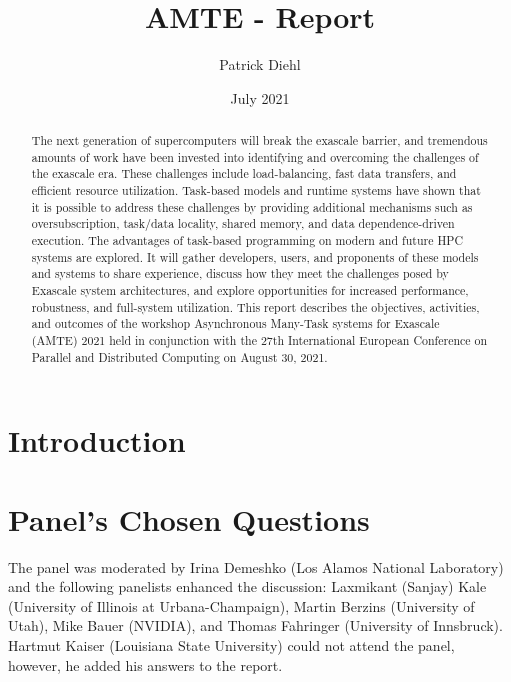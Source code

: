\documentclass{article}
\title{AMTE - Report}
\author{Patrick Diehl}
\date{July 2021}
\begin{document}
\maketitle

\newcommand{\answerbox}[2]{
\begin{tcolorbox}[breakable, enhanced]
\textbf{#1}: \\
#2
\end{tcolorbox}}



\setlength{\parskip}{6pt}

\begin{abstract}
    The next generation of supercomputers will break the exascale barrier, and tremendous amounts of work have been invested into identifying and overcoming the challenges of the exascale era. These challenges include load-balancing, fast data transfers, and efficient resource utilization. Task-based models and runtime systems have shown that it is possible to address these challenges by providing additional mechanisms such as oversubscription, task/data locality, shared memory, and data dependence-driven execution. The advantages of task-based programming on modern and future HPC systems are explored. It will gather developers, users, and proponents of these models and systems to share experience, discuss how they meet the challenges posed by Exascale system architectures, and explore opportunities for increased performance, robustness, and full-system utilization. This report describes the objectives, activities, and outcomes of the workshop Asynchronous Many-Task systems for Exascale (AMTE) 2021 held in conjunction with the 27th International European Conference on Parallel and Distributed Computing on August 30, 2021.
\end{abstract}

\section{Introduction}




\section{Panel’s Chosen Questions}
\label{sec:questions}
The panel was moderated by Irina Demeshko (Los Alamos National Laboratory) and the following panelists enhanced the discussion: Laxmikant (Sanjay) Kale (University of Illinois at Urbana-Champaign), Martin Berzins (University of Utah), Mike Bauer (NVIDIA), and Thomas Fahringer (University of Innsbruck). Hartmut Kaiser (Louisiana State University) could not attend the panel, however, he added his answers to the report.
\end{document}
